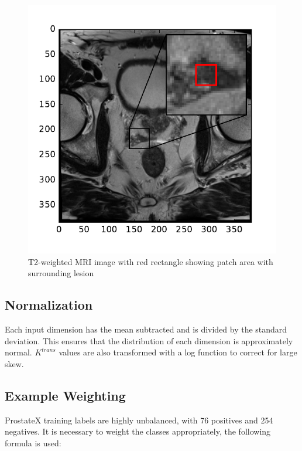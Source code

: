 \documentclass[a4paper]{spie}
\begin{document}
\begin{figure}
\begin{center}
  \caption{T2-weighted MRI image with red rectangle showing patch area with surrounding lesion}
  \label{figure:patch}
  \includegraphics[]{figure-patch.pdf}
\end{center}
\end{figure}

\subsection{Normalization}

Each input dimension has the mean subtracted and is divided by the standard deviation. This ensures that the distribution of each dimension is approximately normal. $K^{\mathit{trans}}$ values are also transformed with a log function to correct for large skew.

\subsection{Example Weighting}

ProstateX training labels are highly unbalanced, with 76 positives and 254 negatives. It is necessary to weight the classes appropriately\cite{Yang2009}, the following formula is used:
\end{document}
